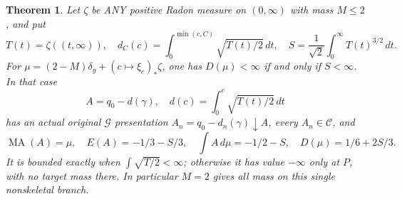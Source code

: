 \documentclass[11pt]{article}
\newtheorem{theorem}{Theorem}
\newcommand{\MA}{\operatorname{MA}}
\newcommand{\C}{\mathcal C}
\newcommand{\G}{\mathcal G}
\begin{document}
\begin{theorem}\label{radon}
Let $\zeta$ be ANY positive Radon measure on $(0,\infty)$ with
mass $M\le2$, and put
\[
 T(t)=\zeta((t,\infty)),\quad
 d_C(c)=\int_0^{\min(c,C)}\sqrt{T(t)/2}\,dt,\quad
 S=\frac1{\sqrt2}\int_0^\infty T(t)^{3/2}\,dt.
\]
For $\mu=(2-M)\delta_g+(c\mapsto\xi_c)_*\zeta$, one has
$D(\mu)<\infty$ if and only if $S<\infty$. In that case
\[
 A=q_0-d(\gamma),\quad d(c)=\int_0^c\sqrt{T(t)/2}\,dt
\]
has an actual original $\G$ presentation
$A_n=q_0-d_n(\gamma)\downarrow A$, every $A_n\in\C$, and
\[
 \MA(A)=\mu,\quad E(A)=-1/3-S/3,\quad
 \int A\,d\mu=-1/2-S,\quad D(\mu)=1/6+2S/3.
\]
It is bounded exactly when $\int\sqrt{T/2}<\infty$; otherwise
it has value $-\infty$ only at $P$, with no target mass there.
In particular $M=2$ gives all mass on this single nonskeletal branch.
\end{theorem}
\end{document}
